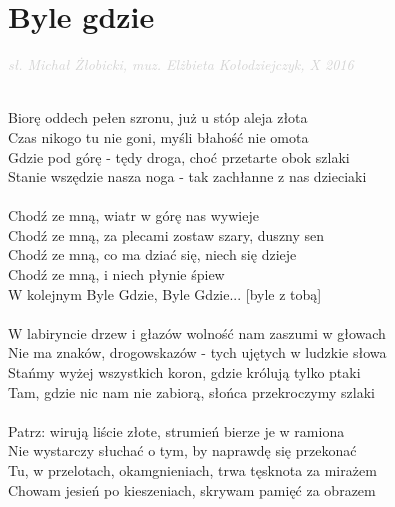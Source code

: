 \documentclass[a5paper, 10pt]{book}
\begin{document}
\section{Byle gdzie}\textcolor{lightgray}{\textit{sł. Michał Żłobicki, muz. Elżbieta Kołodziejczyk, X 2016}}\\
\begin{minipage}[t]{0.8\textwidth}
~\\
Biorę oddech pełen szronu, już u stóp aleja złota		\\
Czas nikogo tu nie goni, myśli błahość nie omota		\\
Gdzie pod górę - tędy droga, choć przetarte obok szlaki\\
Stanie wszędzie nasza noga - tak zachłanne z nas dzieciaki\\
\\
\hspace*{5mm}Chodź ze mną, wiatr w górę nas wywieje			\\
\hspace*{5mm}Chodź ze mną, za plecami zostaw szary, duszny sen\\
\hspace*{5mm}Chodź ze mną, co ma dziać się, niech się dzieje		\\
\hspace*{5mm}Chodź ze mną, i niech płynie śpiew			\\
\hspace*{5mm}W kolejnym Byle Gdzie, Byle Gdzie... [byle z tobą]\\
\\
W labiryncie drzew i głazów wolność nam zaszumi w głowach\\
Nie ma znaków, drogowskazów - tych ujętych w ludzkie słowa\\
Stańmy wyżej wszystkich koron, gdzie królują tylko ptaki\\
Tam, gdzie nic nam nie zabiorą, słońca przekroczymy szlaki\\
\\
Patrz: wirują liście złote, strumień bierze je w ramiona\\
Nie wystarczy słuchać o tym, by naprawdę się przekonać\\
Tu, w przelotach, okamgnieniach, trwa tęsknota za mirażem\\
Chowam jesień po kieszeniach, skrywam pamięć za obrazem\\
\end{minipage}
\end{document}
